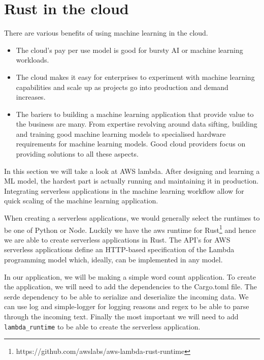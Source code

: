 \documentclass{book}
\begin{document}
\section{Rust in the cloud}%
There are various benefits of using machine learning in the cloud.

\begin{itemize}
	\item The cloud's pay per use model is good for bursty AI or machine learning workloads.
	\item The cloud makes it easy for enterprises to experiment with machine learning capabilities and scale up as projects go into production and demand increases.
	\item The bariers to building a machine learning application that provide value to the business are many. From expertise revolving around data sifting, building and training good machine learning models to specialised hardware requirements for machine learning models. Good cloud providers focus on providing solutions to all these aspects.
\end{itemize}

In this section we will take a look at AWS lambda. After designing and learning a ML model, the hardest part is actually running and maintaining it in production. Integrating serverless applications in the machine learning workflow allow for quick scaling of the machine learning application.

When creating a serverless applications, we would generally select the runtimes to be one of Python or Node. Luckily we have the aws runtime for Rust\footnote{\url{}{https://github.com/awslabs/aws-lambda-rust-runtime}} and hence we are able to create serverless applications in Rust. The API's for AWS serverless applications define an HTTP-based specification of the Lambda programming model which, ideally, can be implemented in any model.

In our application, we will be making a simple word count application. To create the application, we will need to add the dependencies to the Cargo.toml file. The serde dependency to be able to serialize and deserialize the incoming data. We can use log and simple-logger for logging reasons and regex to be able to parse through the incoming text. Finally the most important we will need to add \lstinline{lambda_runtime} to be able to create the serverless application.
\end{document}
